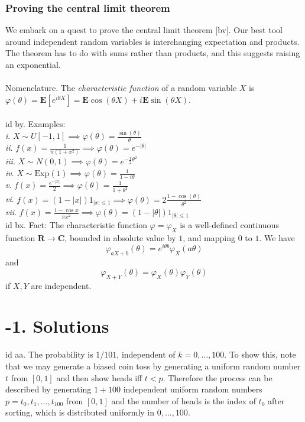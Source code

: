 \documentclass[oneside]{book}
\newcommand{\vphi}{\varphi}
\newcommand{\R}{\mathbf{R}}
\newcommand{\E}{\mathbf{E}}
\newcommand{\C}{\mathbf{C}}
\newcommand{\abs}[1]{\left\lvert #1\right\rvert}
\newcommand{\Exp}{\mathrm{Exp}}
\renewcommand{\i}{{\it i}. }
\newcommand{\ii}{{\it ii}. }
\newcommand{\iii}{{\it iii}. }
\newcommand{\iv}{{\it iv}. }
\renewcommand{\v}{{\it v}. }
\newcommand{\vi}{{\it vi}. }
\newcommand{\vii}{{\it vii}. }
\newcommand\chap[1]{%
  \chapter*{#1}%
  \addcontentsline{toc}{chapter}{#1}}
\begin{document}
\newpage
\subsection*{Proving the central limit theorem}


We embark on a quest to prove the central limit theorem [bv]. Our best tool around independent random variables is interchanging expectation and products. The theorem has to do with sums rather than products, and this suggests raising an exponential.  \\\\ 


Nomenclature. The {\it characteristic function} of a random variable $X$ is $\vphi(\theta)= \E[e^{i\theta X}]=\E\cos(\theta X)+i\E\sin(\theta X)$. \\\\


id by. Examples:    \\
\i $X\sim U[-1,1] \implies \vphi(\theta)=\frac{\sin(\theta)}{\theta}$   \\
\ii $f(x)=\frac{1}{\pi(1+x^2)}\implies \vphi(\theta)=e^{-\abs{\theta}}$ \\
\iii $X\sim N(0,1)\implies \vphi(\theta)=e^{-\frac{1}{2}\theta^2}$  \\
\iv $X\sim\Exp(1)\implies \vphi(\theta)=\frac{1}{1-i\theta}$    \\
\v $f(x)=\frac{e^{-\abs{x}}}{2}\implies \vphi(\theta)=\frac{1}{1+\theta^2}$     \\
\vi $f(x)=(1-\abs{x})1_{\abs{x}\le1}\implies \vphi(\theta)=2\frac{1-\cos\left(\theta\right)}{\theta^{2}}$ \\
\vii $f(x)=\frac{1-\cos x}{\pi x^2}\implies \vphi(\theta)=(1-\abs{\theta})1_{\abs{\theta}\le 1}$
\\


id bx. Fact: The characteristic function $\vphi=\vphi_X$ is a well-defined continuous function $\R\to\C$, bounded in absolute value by $1$, and mapping $0$ to $1$. We have
$$\vphi_{aX+b}(\theta)=e^{i\theta b}\vphi_X(a\theta)$$ and $$\vphi_{X+Y}(\theta)=\vphi_X(\theta)\vphi_Y(\theta)$$
if $X,Y$ are independent.\\





\newpage
\chap{-1. Solutions} \label{sol}
id aa. The probability is $1/101$, independent of $k=0,\dots,100$. To show this, note that we may generate a biased coin toss by generating a uniform random number $t$ from $[0,1]$ and then show heads iff $t<p$. Therefore the process can be described by generating $1+100$ independent uniform random numbers $p=t_0,t_1,\dots,t_{100}$ from $[0,1]$ and the number of heads is the index of $t_0$ after sorting, which is distributed uniformly in $0,\dots,100$.  \\\\
\end{document}
